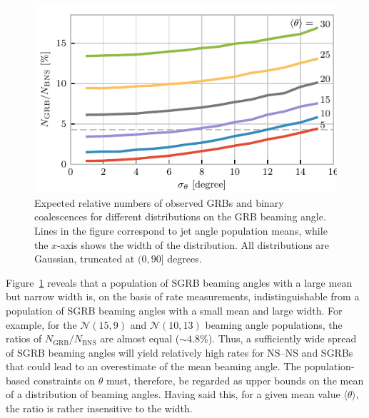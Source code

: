 \documentclass[twocolumn,nofootinbib]{revtex4-1}
\newcommand{\BNS}{\ac{NS}--\ac{NS}\xspace}
\begin{document}
\begin{figure}
\centering
\includegraphics[width=\linewidth]{color_relativenumber.pdf}
\caption{\label{fig:thetapopulation} Expected relative numbers of
  observed GRBs and binary coalescences for different distributions on
  the GRB beaming angle.  Lines in the figure correspond to jet angle
  population means, while the $x$-axis shows the width of the
  distribution.  All distributions are Gaussian, truncated at
  $(0, 90]$ degrees.\label{fig:thetapop}}
\end{figure}




Figure~\ref{fig:thetapop} reveals that a population of \ac{SGRB} beaming angles with a large mean but narrow width is, on the basis of rate measurements, indistinguishable from a population of \ac{SGRB} beaming angles with a small mean and large width.
For example, for the ${\mathcal N}(15,9)$ and ${\mathcal N}(10,13)$ beaming angle populations, the ratios of $N_{\mathrm{GRB}}/N_{\mathrm{BNS}}$ are almost equal ($\sim 4.8\%$).
Thus, a sufficiently wide spread of \ac{SGRB} beaming angles will yield relatively high rates for \BNS and \acp{SGRB} that could lead to an overestimate of the mean beaming angle.
The population-based constraints on $\theta$ must, therefore, be regarded as upper bounds on the mean of a distribution of beaming angles.
Having said this, for a given mean value $\langle \theta \rangle$, the ratio is rather insensitive to the width.
\end{document}
